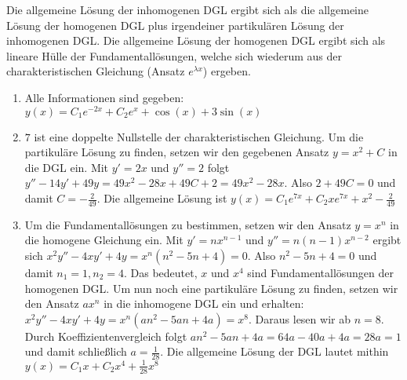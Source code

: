 \item Die allgemeine Lösung der inhomogenen DGL ergibt sich als die allgemeine Lösung der homogenen DGL plus irgendeiner partikulären Lösung der inhomogenen DGL. Die allgemeine Lösung der homogenen DGL ergibt sich als lineare Hülle der Fundamentallösungen, welche sich wiederum aus der charakteristischen Gleichung (Ansatz $e^{\lambda x}$) ergeben.

\begin{enumerate}
	\item Alle Informationen sind gegeben: $y(x) = C_1e^{-2x}+C_2e^{x}+\cos(x)+3\sin(x)$
	\item $7$ ist eine doppelte Nullstelle der charakteristischen Gleichung. Um die partikuläre Lösung zu finden, setzen wir den gegebenen Ansatz $y=x^2+C$ in die DGL ein. Mit $y'=2x$ und $y''=2$ folgt $y''-14y'+49y=49x^2-28x+49C+2 = 49x^2-28x$. Also $2+49C=0$ und damit $C=-\frac{2}{49}$. Die allgemeine Lösung ist $y(x) = C_1 e^{7x} + C_2 x e^{7x} + x^2 - \frac{2}{49}$
	\item Um die Fundamentallösungen zu bestimmen, setzen wir den Ansatz $y=x^n$ in die homogene Gleichung ein. Mit $y'=nx^{n-1}$ und $y''=n(n-1)x^{n-2}$ ergibt sich $x^2y''-4xy'+4y = x^n (n^2-5n+4) = 0$. Also $n^2-5n+4 = 0$ und damit $n_1 = 1, n_2 = 4$. Das bedeutet, $x$ und $x^4$ sind Fundamentallösungen der homogenen DGL. Um nun noch eine partikuläre Lösung zu finden, setzen wir den Ansatz $ax^n$ in die inhomogene DGL ein und erhalten: $x^2y''-4xy'+4y = x^n (an^2-5an+4a) = x^8$. Daraus lesen wir ab $n=8$. Durch Koeffizientenvergleich folgt $an^2-5an+4a = 64a-40a+4a=28a=1$ und damit schließlich $a=\frac{1}{28}$. Die allgemeine Lösung der DGL lautet mithin $y(x) = C_1x+C_2x^4+\frac{1}{28}x^8$
\end{enumerate}